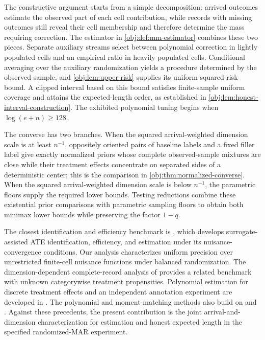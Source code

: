 \documentclass[11pt]{article}
\begin{document}
The constructive argument starts from a simple decomposition: arrived outcomes estimate the observed part of each cell contribution, while records with missing outcomes still reveal their cell membership and therefore determine the mass requiring correction. The estimator in \cref{obj:def:mm-estimator} combines these two pieces. Separate auxiliary streams select between polynomial correction in lightly populated cells and an empirical ratio in heavily populated cells. Conditional averaging over the auxiliary randomization yields a procedure determined by the observed sample, and \cref{obj:lem:upper-risk} supplies its uniform squared-risk bound. A clipped interval based on this bound satisfies finite-sample uniform coverage and attains the expected-length order, as established in \cref{obj:lem:honest-interval-construction}. The exhibited polynomial tuning begins when \(\log(e+n)\ge128\).

The converse has two branches. When the squared arrival-weighted dimension scale is at least \(n^{-1}\), oppositely oriented pairs of baseline labels and a fixed filler label give exactly normalized priors whose complete observed-sample mixtures are close while their treatment effects concentrate on separated sides of a deterministic center; this is the comparison in \cref{obj:thm:normalized-converse}. When the squared arrival-weighted dimension scale is below \(n^{-1}\), the parametric floors supply the required lower bounds. Testing reductions combine these existential prior comparisons with parametric sampling floors to obtain both minimax lower bounds while preserving the factor \(1-q\).

The closest identification and efficiency benchmark is \citet[Lemma~1.1 under Assumptions~1--3, Theorem~2.1, and Sections~3--4]{KallusMao2025}, which develops surrogate-assisted ATE identification, efficiency, and estimation under its nuisance-convergence conditions. Our analysis characterizes uniform precision over unrestricted finite-cell nuisance functions under balanced randomization. The dimension-dependent complete-record analysis of \citet[Theorems~1--2 and Appendix~C.5]{ZengBalakrishnanHanKennedy2024} provides a related benchmark with unknown categorywise treatment propensities. Polynomial estimation for discrete treatment effects and an independent annotation experiment are developed in \citet{CausalSmith2026,CausalSmith2026Annotation}. The polynomial and moment-matching methods also build on \citet[Sections~III--IV]{JiaoVenkatHanWeissman2015} and \citet[Proposition~3 and Appendix~B.2]{WuYang2016}. Against these precedents, the present contribution is the joint arrival-and-dimension characterization for estimation and honest expected length in the specified randomized-MAR experiment.
\end{document}

